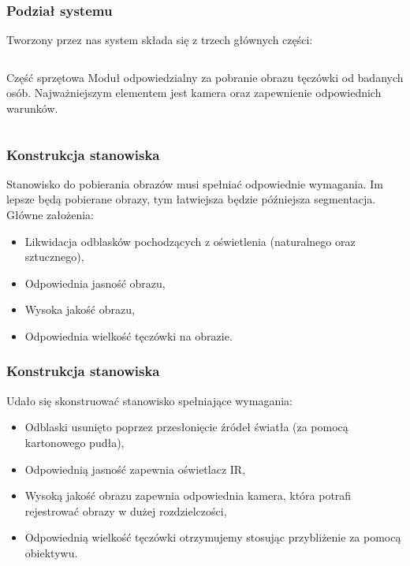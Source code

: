 \documentclass{beamer}
\begin{document}

\begin{frame}
\frametitle{Podział systemu}

Tworzony przez nas system składa się z trzech głównych części:
\begin{columns}[t]
\begin{block}{Część sprzętowa}
Moduł odpowiedzialny za pobranie obrazu tęczówki od badanych osób. Najważniejszym elementem jest kamera oraz zapewnienie odpowiednich warunków.
\end{block}
\end{columns} 

\end{frame}


\begin{frame}
\frametitle{Konstrukcja stanowiska}
Stanowisko do pobierania obrazów musi spełniać odpowiednie wymagania. Im lepsze będą pobierane obrazy, tym łatwiejsza będzie późniejsza segmentacja. Główne założenia:
\begin{itemize}
\item Likwidacja odblasków pochodzących z oświetlenia (naturalnego oraz sztucznego),
\item Odpowiednia jasność obrazu,
\item Wysoka jakość obrazu,
\item Odpowiednia wielkość tęczówki na obrazie.
\end{itemize}
\end{frame}

\begin{frame}
\frametitle{Konstrukcja stanowiska}
Udało się skonstruować stanowisko spełniające wymagania:
\begin{itemize}
\item Odblaski usunięto poprzez przesłonięcie źródeł światła (za pomocą kartonowego pudła),
\item Odpowiednią jasność zapewnia oświetlacz IR,
\item Wysoką jakość obrazu zapewnia odpowiednia kamera, która potrafi rejestrować obrazy w dużej rozdzielczości,
\item Odpowiednią wielkość tęczówki otrzymujemy stosując przybliżenie za pomocą obiektywu.
\end{itemize}
\end{frame}
\end{document}
